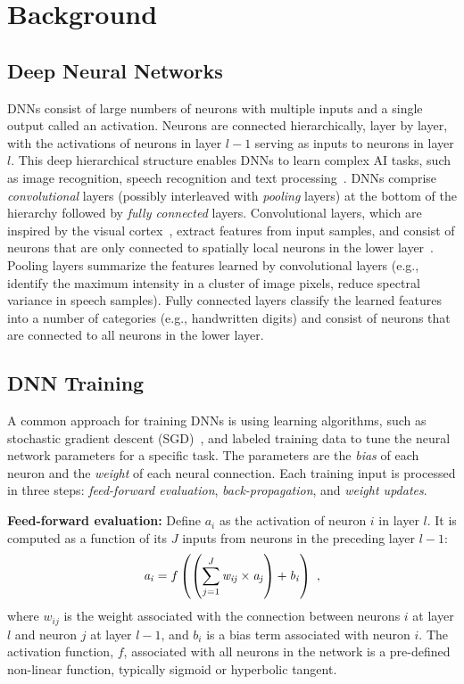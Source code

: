 \section{Background}
\label{sec:background}

\subsection{Deep Neural Networks}
\label{subsec:dnn}
DNNs consist of large numbers of neurons with multiple inputs and a single output called an activation. Neurons are connected hierarchically, layer by layer, with the activations of neurons in layer $l-1$ serving as inputs to neurons in layer $l$.  This deep hierarchical structure enables DNNs to learn complex AI tasks, such as image recognition, speech recognition and text processing~\cite{Bengio09}. DNNs comprise {\it convolutional} layers (possibly interleaved with {\it pooling} layers) at the bottom of the hierarchy followed by {\it fully connected} layers.  Convolutional layers, which are inspired by the visual cortex~\cite{Hubel59}, extract features from input samples, and consist of neurons that are only connected to spatially local neurons in the lower layer~\cite{LeCun98b}.  Pooling layers summarize the features learned by convolutional layers (e.g., identify the maximum intensity in a cluster of image pixels, reduce spectral variance in speech samples).  Fully connected layers classify the learned features into a number of categories (e.g., handwritten digits) and consist of neurons that are connected to all neurons in the lower layer.

\subsection{DNN Training}
\label{subsec:dnn_training}
A common approach for training DNNs is using  learning algorithms, such as stochastic gradient descent (SGD)~\cite{Bottou10}, and labeled training data to tune the neural network parameters for a specific task. The parameters are the {\em bias} of each neuron and the {\em weight} of each neural connection. Each training input is processed in three steps: {\em feed-forward evaluation}, {\em back-propagation}, and {\em weight updates}.

{\bf Feed-forward evaluation:}
Define $a_{i}$ as the activation of neuron $i$ in layer $l$. It is computed as a function of its $J$ inputs from neurons in the preceding layer $l-1$:
\begin{equation}
{\it a_{i}} = f\left(\left(\sum\limits_{j=1}^{J}{\it w_{ij}} \times {\it a_{j}}\right) + {\it b_{i}}\right) \ ,
\label{eqn:fwd_activation}
\end{equation}
where $w_{ij}$ is the weight associated with the connection between neurons $i$ at layer $l$ and neuron $j$ at layer $l-1$, and $b_{i}$ is a bias term associated with neuron $i$. The activation function, $f$, associated with all neurons in the network is a pre-defined non-linear function, typically sigmoid or hyperbolic tangent.

